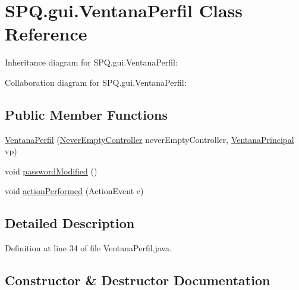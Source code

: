 \hypertarget{class_s_p_q_1_1gui_1_1_ventana_perfil}{}\section{S\+P\+Q.\+gui.\+Ventana\+Perfil Class Reference}
\label{class_s_p_q_1_1gui_1_1_ventana_perfil}


Inheritance diagram for S\+P\+Q.\+gui.\+Ventana\+Perfil\+:


Collaboration diagram for S\+P\+Q.\+gui.\+Ventana\+Perfil\+:
\subsection*{Public Member Functions}
\begin{DoxyCompactItemize}
\item 
\mbox{\hyperlink{class_s_p_q_1_1gui_1_1_ventana_perfil_a16166538d7497a79cdc1e383ae852ac1}{Ventana\+Perfil}} (\mbox{\hyperlink{class_s_p_q_1_1controller_1_1_never_empty_controller}{Never\+Empty\+Controller}} never\+Empty\+Controller, \mbox{\hyperlink{class_s_p_q_1_1gui_1_1_ventana_principal}{Ventana\+Principal}} vp)
\item 
void \mbox{\hyperlink{class_s_p_q_1_1gui_1_1_ventana_perfil_a65b1807fdef3dcfdaf5564d2148fc46d}{password\+Modified}} ()
\item 
void \mbox{\hyperlink{class_s_p_q_1_1gui_1_1_ventana_perfil_ab3748a16025307c203ba1dd2c5385b23}{action\+Performed}} (Action\+Event e)
\end{DoxyCompactItemize}


\subsection{Detailed Description}


Definition at line 34 of file Ventana\+Perfil.\+java.



\subsection{Constructor \& Destructor Documentation}
\mbox{\label{class_s_p_q_1_1gui_1_1_ventana_perfil_a16166538d7497a79cdc1e383ae852ac1}} 
